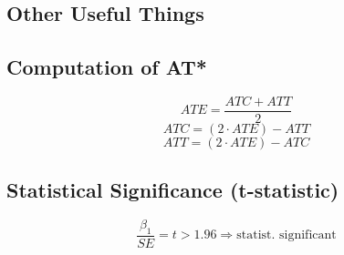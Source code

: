\documentclass[a3paper, 8pt]{extarticle}
\begin{document}
\begin{multicols*}{5}





\newpage

\section{Other Useful Things}
\subsection{Computation of AT*}
$$ATE=\frac{ATC+ATT}{2}$$
$$ATC=(2\cdot ATE)-ATT$$
$$ATT=(2\cdot ATE)-ATC$$

\subsection{Statistical Significance (t-statistic)}
$$\frac{\beta_1}{SE}=t > 1.96 \Rightarrow \text{statist. significant}$$


\end{multicols*}
\end{document}
